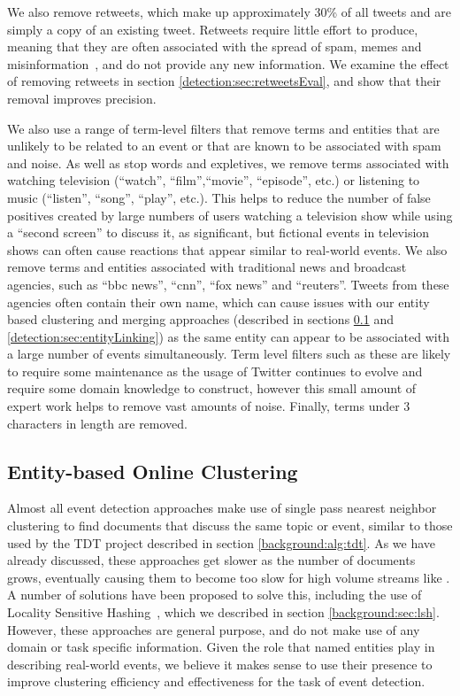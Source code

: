 We also remove retweets, which make up approximately 30\% of all tweets and are simply a copy of an existing tweet.
Retweets require little effort to produce, meaning that they are often associated with the spread of spam, memes and misinformation~\citep{Grier:2010:SUC:1866307.1866311}, and do not provide any new information.
We examine the effect of removing retweets in section \ref{detection:sec:retweetsEval}, and show that their removal improves precision.

We also use a range of term-level filters that remove terms and entities that are unlikely to be related to an event or that are known to be associated with spam and noise.
As well as stop words and expletives, we remove terms associated with watching television (``watch'', ``film'',``movie'', ``episode'', etc.) or listening to music (``listen'', ``song'', ``play'', etc.).
This helps to reduce the number of false positives created by large numbers of users watching a television show while using a ``second screen'' to discuss it, as significant, but fictional events in television shows can often cause reactions that appear similar to real-world events.
We also remove terms and entities associated with traditional news and broadcast agencies, such as ``bbc news'', ``cnn'', ``fox news'' and ``reuters''.
Tweets from these agencies often contain their own name, which can cause issues with our entity based clustering and merging approaches (described in sections \ref{detection:sec:clustering} and \ref{detection:sec:entityLinking}) as the same entity can appear to be associated with a large number of events simultaneously.
Term level filters such as these are likely to require some maintenance as the usage of Twitter continues to evolve and require some domain knowledge to construct, however this small amount of expert work helps to remove vast amounts of noise.
Finally, terms under 3 characters in length are removed.

\subsection{Entity-based Online Clustering}
\label{detection:sec:clustering}
Almost all event detection approaches make use of single pass nearest neighbor clustering to find documents that discuss the same topic or event, similar to those used by the TDT project described in section \ref{background:alg:tdt}.
As we have already discussed, these approaches get slower as the number of documents grows, eventually causing them to become too slow for high volume streams like \citep{Petrovic10}.
A number of solutions have been proposed to solve this, including the use of Locality Sensitive Hashing~\citep{Petrovic10}, which we described in section \ref{background:sec:lsh}.
However, these approaches are general purpose, and do not make use of any domain or task specific information.
Given the role that named entities play in describing real-world events, we believe it makes sense to use their presence to improve clustering efficiency and effectiveness for the task of event detection.

